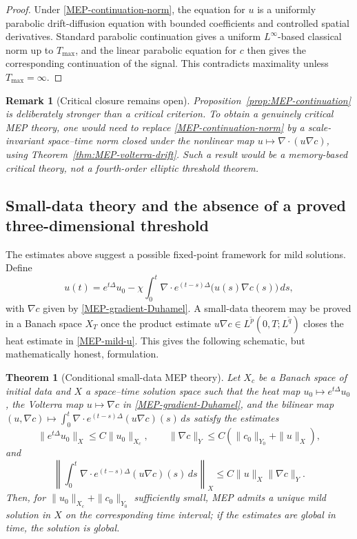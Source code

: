\documentclass[pdflatex,sn-mathphys-num]{sn-jnl}%
\theoremstyle{thmstyleone}
\newtheorem{theorem}{Theorem}
\theoremstyle{thmstyletwo}
\newtheorem{remark}{Remark}
\theoremstyle{thmstylethree}
\begin{document}
\begin{proof}
Under \eqref{MEP-continuation-norm}, the equation for \(u\) is a uniformly
parabolic drift-diffusion equation with bounded coefficients and controlled
spatial derivatives.  Standard parabolic continuation gives a uniform
\(L^\infty\)-based classical norm up to \(T_{\max}\), and the linear parabolic
equation for \(c\) then gives the corresponding continuation of the signal.
This contradicts maximality unless \(T_{\max}=\infty\).
\end{proof}

\begin{remark}[Critical closure remains open]
\label{rem:MEP-critical-open}
Proposition~\ref{prop:MEP-continuation} is deliberately stronger than a
critical criterion.  To obtain a genuinely critical MEP theory, one would need
to replace \eqref{MEP-continuation-norm} by a scale-invariant space--time norm
closed under the nonlinear map \(u\mapsto\nabla\cdot(u\nabla c)\), using
Theorem~\ref{thm:MEP-volterra-drift}.  Such a result would be a memory-based
critical theory, not a fourth-order elliptic threshold theorem.
\end{remark}

\subsection{Small-data theory and the absence of a proved three-dimensional threshold}
\label{ssec:small_data}
The estimates above suggest a possible fixed-point framework for mild
solutions.  Define
\begin{equation}
        u(t)=e^{t\Delta}u_0
        -
        \chi\int_0^t\nabla\cdot e^{(t-s)\Delta}
        \bigl(u(s)\nabla c(s)\bigr)\,ds,
\label{MEP-mild-u}
\end{equation}
with \(\nabla c\) given by \eqref{MEP-gradient-Duhamel}.  A small-data theorem
may be proved in a Banach space \(X_T\) once the product estimate
\(u\nabla c\in L^{\tilde p}(0,T;L^{\tilde q})\) closes the heat estimate in
\eqref{MEP-mild-u}.  This gives the following schematic, but mathematically
honest, formulation.

\begin{theorem}[Conditional small-data MEP theory]
\label{thm:MEP-conditional-small-data}
Let \(X_c\) be a Banach space of initial data and \(X\) a space--time solution
space such that the heat map \(u_0\mapsto e^{t\Delta}u_0\), the Volterra map
\(u\mapsto\nabla c\) in \eqref{MEP-gradient-Duhamel}, and the bilinear map
\((u,\nabla c)\mapsto \int_0^t\nabla\cdot e^{(t-s)\Delta}(u\nabla c)(s)\,ds\)
satisfy the estimates
\[
        \|e^{t\Delta}u_0\|_X\le C\|u_0\|_{X_c},
        \qquad
        \|\nabla c\|_Y\le C(\|c_0\|_{Y_0}+\|u\|_X),
\]
and
\[
        \left\|
        \int_0^t\nabla\cdot e^{(t-s)\Delta}(u\nabla c)(s)\,ds
        \right\|_X
        \le
        C\|u\|_X\|\nabla c\|_Y .
\]
Then, for \(\|u_0\|_{X_c}+\|c_0\|_{Y_0}\) sufficiently small, MEP admits a
unique mild solution in \(X\) on the corresponding time interval; if the
estimates are global in time, the solution is global.
\end{theorem}
\end{document}
